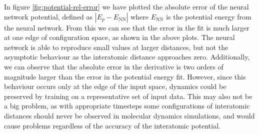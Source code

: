 In figure \ref{fig:potential-rel-error} we have plotted
the absolute error of the neural network potential, defined
as $\left| E_p - E_{\text{NN}}\right|$
where $E_{\text{NN}}$ is the potential energy from the neural network.
From this we can see that the error in the fit is much larger
at one edge of configuration space, as shown in the above plots.
The neural network is able to reproduce small values
at larger distances, but not the asymptotic behaviour
as the interatomic distance approaches zero.
Additionally, we can observe that the absolute error in the derivative
is two orders of magnitude larger than the error in the potential energy fit.
However, since
this behaviour occurs only at the edge of the input space,
dynamics could be preserved by training on a representative set
of input data. This may also not be a big problem, as
with appropriate timesteps some configurations of interatomic distances
should never be observed in molecular dynamics simulations,
and would cause problems regardless of the accuracy of the
interatomic potential.
